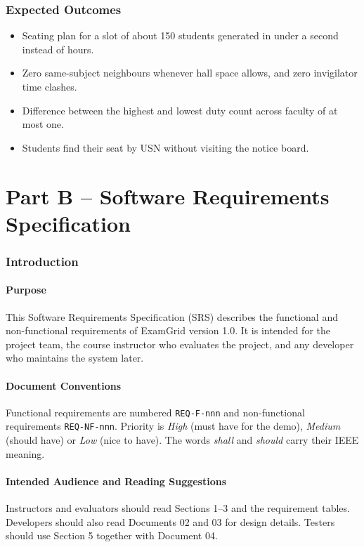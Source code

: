 \documentclass[11pt,a4paper]{article}
\begin{document}
\section{Expected Outcomes}
\begin{itemize}
  \item Seating plan for a slot of about 150 students generated in under a second instead of hours.
  \item Zero same-subject neighbours whenever hall space allows, and zero invigilator time clashes.
  \item Difference between the highest and lowest duty count across faculty of at most one.
  \item Students find their seat by USN without visiting the notice board.
\end{itemize}

\newpage
\part*{Part B -- Software Requirements Specification}

\section{Introduction}
\subsection{Purpose}
This Software Requirements Specification (SRS) describes the functional and non-functional requirements of ExamGrid version 1.0. It is intended for the project team, the course instructor who evaluates the project, and any developer who maintains the system later.

\subsection{Document Conventions}
Functional requirements are numbered \texttt{REQ-F-nnn} and non-functional requirements \texttt{REQ-NF-nnn}. Priority is \emph{High} (must have for the demo), \emph{Medium} (should have) or \emph{Low} (nice to have). The words \emph{shall} and \emph{should} carry their IEEE meaning.

\subsection{Intended Audience and Reading Suggestions}
Instructors and evaluators should read Sections 1--3 and the requirement tables. Developers should also read Documents 02 and 03 for design details. Testers should use Section 5 together with Document 04.
\end{document}
